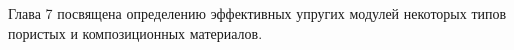 \begin{russian}
Глава 7 посвящена определению эффективных упругих модулей некоторых типов пористых и композиционных материалов. 
 

\end{russian}
